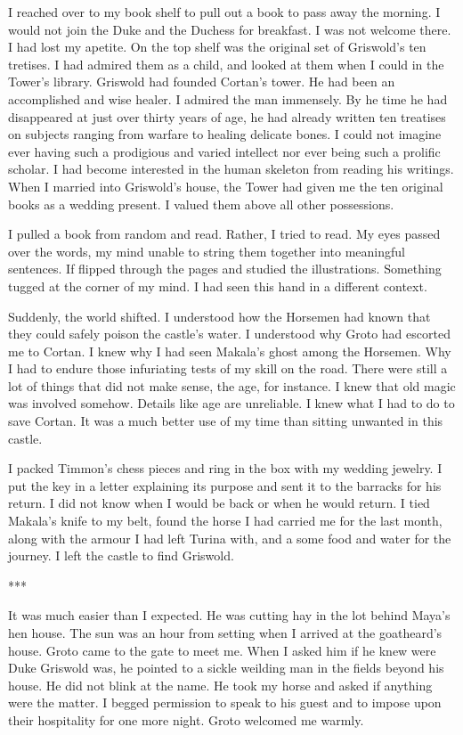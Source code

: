 \documentclass{article}
\begin{document}
I reached over to my book shelf to pull out a book to pass away the morning. I would not join the Duke and the Duchess for breakfast. I was not welcome there. I had lost my apetite. On the top shelf was the original set of Griswold's ten tretises. I had admired them as a child, and looked at them when I could in the Tower's library. Griswold had founded Cortan's tower. He had been an accomplished and wise healer. I admired the man immensely. By he time he had disappeared at just over thirty years of age, he had already written ten treatises on subjects ranging from warfare to healing delicate bones. I could not imagine ever having such a prodigious and varied intellect nor ever being such a prolific scholar. I had become interested in the human skeleton from reading his writings. When I married into Griswold's house, the Tower had given me the ten original books as a wedding present. I valued them above all other possessions. 

I pulled a book from random and read. Rather, I tried to read. My eyes passed over the words, my mind unable to string them together into meaningful sentences. If flipped through the pages and studied the illustrations. Something tugged at the corner of my mind. I had seen this hand in a different context.

Suddenly, the world shifted. I understood how the Horsemen had known that they could safely poison the castle's water. I understood why Groto had escorted me to Cortan. I knew why I had seen Makala's ghost among the Horsemen. Why I had to endure those infuriating tests of my skill on the road. There were still a lot of things that did not make sense, the age, for instance. I knew that old magic was involved somehow. Details like age are unreliable. I knew what I had to do to save Cortan. It was a much better use of my time than sitting unwanted in this castle.

I packed Timmon's chess pieces and ring in the box with my wedding jewelry. I put the key in a letter explaining its purpose and sent it to the barracks for his return. I did not know when I would be back or when he would return. I tied Makala's knife to my belt, found the horse I had carried me for the last month, along with the armour I had left Turina with, and a some food and water for the journey. I left the castle to find Griswold.

***

It was much easier than I expected. He was cutting hay in the lot behind Maya's hen house. The sun was an hour from setting when I arrived at the goatheard's house. Groto came to the gate to meet me. When I asked him if he knew were Duke Griswold was, he pointed to a sickle weilding man in the fields beyond his house. He did not blink at the name. He took my horse and asked if anything were the matter. I begged permission to speak to his guest and to impose upon their hospitality for one more night. Groto welcomed me warmly. 
\end{document}
